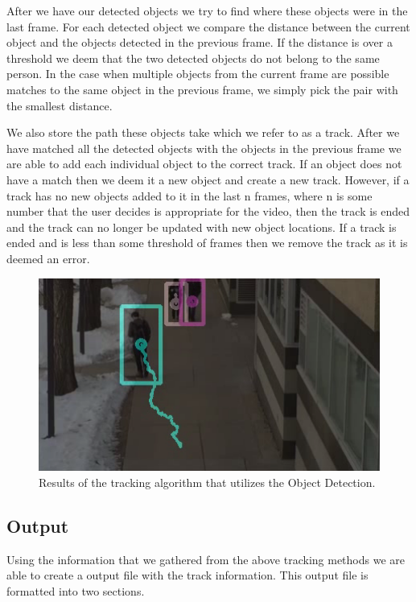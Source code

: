 \documentclass[12pt, onecolumn, conference]{IEEEtran}
\begin{document}
After we have our detected objects we try to find where these objects were in the last frame. For each detected object we compare the distance between the current object and the objects detected in the previous frame. If the distance is over a threshold we deem that the two detected objects do not belong to the same person. In the case when multiple objects from the current frame are possible matches to the same object in the previous frame, we simply pick the pair with the smallest distance.

We also store the path these objects take which we refer to as a track. After we have matched all the detected objects with the objects in the previous frame we are able to add each individual object to the correct track. If an object does not have a match then we deem it a new object and create a new track. However, if a track has no new objects added to it in the last n frames, where n is some number that the user decides is appropriate for the video, then the track is ended and the track can no longer be updated with new object locations. If a track is ended and is less than some threshold of frames then we remove the track as it is deemed an error.

\begin{figure}[!t]
\centering
\includegraphics[height=2.5in]{Screenshots/OB_Tracking.png}
\caption{Results of the tracking algorithm that utilizes the Object Detection.}
\label{Tracking_Object_Detection}
\end{figure}

\subsection{Output}

Using the information that we gathered from the above tracking methods we are able to create a output file with the track information. This output file is formatted into two sections.
\end{document}
